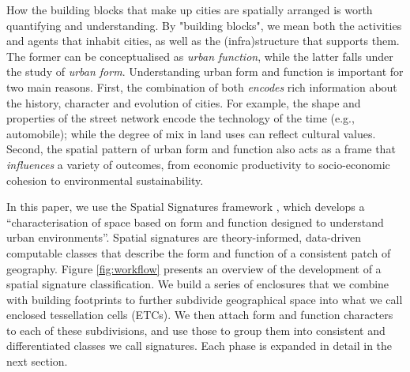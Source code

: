 


How the building blocks that make up cities are spatially arranged is worth
quantifying and understanding.
By "building blocks", we mean both the activities and agents that inhabit
cities, as well as the (infra)structure that supports them. The
former can be conceptualised as \textit{urban function}, while the latter
falls under the study of \textit{urban form}.
Understanding urban form and function is important for two main reasons.
First, the combination of both \textit{encodes} rich information about the
history, character and evolution of cities.
%
For example, the shape and properties of the street network encode the technology of the
time (e.g., automobile); while the degree of mix in land uses can reflect
cultural values.
Second, the spatial pattern of urban form and function also acts as a
frame that \textit{influences} a variety of outcomes, from economic
productivity to socio-economic cohesion to environmental sustainability.

In this paper, we use the Spatial Signatures framework \cite{dab_mf_2021a, dab_mf_2021b},
which develops a ``characterisation of space based on form and function
designed to understand urban environments''\cite{dab_mf_2021a}.
Spatial signatures are theory-informed, data-driven computable classes that
describe the form and function of a consistent patch of geography.
%
Figure \ref{fig:workflow} presents an overview of the development of a spatial
signature classification.
%
We build a series of enclosures that we combine with building footprints
to further subdivide geographical space into what we call enclosed tessellation cells (ETCs). We then attach form and function
characters to each of these subdivisions, and use those to group them into
consistent and differentiated classes we call signatures.
%
Each phase is expanded in detail in the next section.


